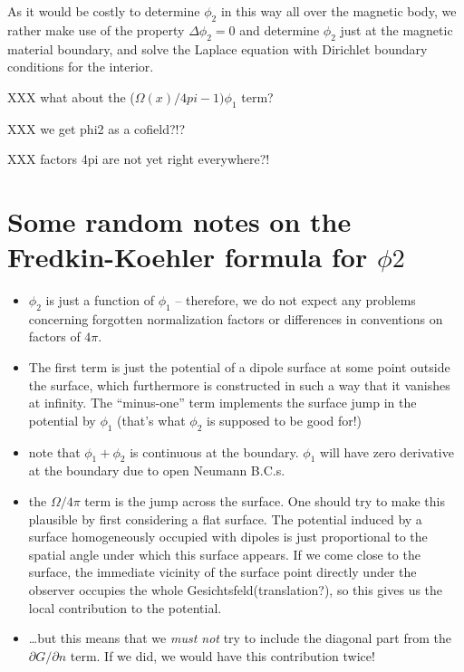 \documentclass{article}
\newcommand{\Laplace}{\Delta}
\begin{document}
As it would be costly to determine $\phi_2$ in this way all over the
magnetic body, we rather make use of the property $\Laplace \phi_2=0$
and determine $\phi_2$ just at the magnetic material boundary, and
solve the Laplace equation with Dirichlet boundary conditions for the
interior.

XXX what about the ($\Omega(x)/4pi-1)\phi_1$ term?

XXX we get phi2 as a cofield?!?

XXX factors 4pi are not yet right everywhere?!

\section{Some random notes on the Fredkin-Koehler formula for $\phi2$}

\begin{itemize}

\item $\phi_2$ is just a function of $\phi_1$ -- therefore,
we do not expect any problems concerning forgotten normalization factors
or differences in conventions on factors of $4\pi$.

\item The first term is just the potential of a dipole surface at some point
outside the surface, which furthermore is constructed in such a way that it
vanishes at infinity. The ``minus-one'' term implements the surface jump
in the potential by $\phi_1$ (that's what $\phi_2$ is supposed to be good for!)

\item note that $\phi_1+\phi_2$ is continuous at the boundary. $\phi_1$ will have
zero derivative at the boundary due to open Neumann B.C.s.

\item the $\Omega/4\pi$ term is the jump across the surface.
One should try to make this plausible by first considering a flat surface.
The potential induced by a surface homogeneously occupied with dipoles is
just proportional to the spatial angle under which this surface appears.
If we come close to the surface, the immediate vicinity of the surface point
directly under the observer occupies the whole Gesichtsfeld(translation?),
so this gives us the local contribution to the potential.

\item\dots but this means that we {\em must not} try to include the diagonal part from
the $\partial G/\partial n$ term. If we did, we would have this contribution twice!

\end{itemize}
\end{document}
